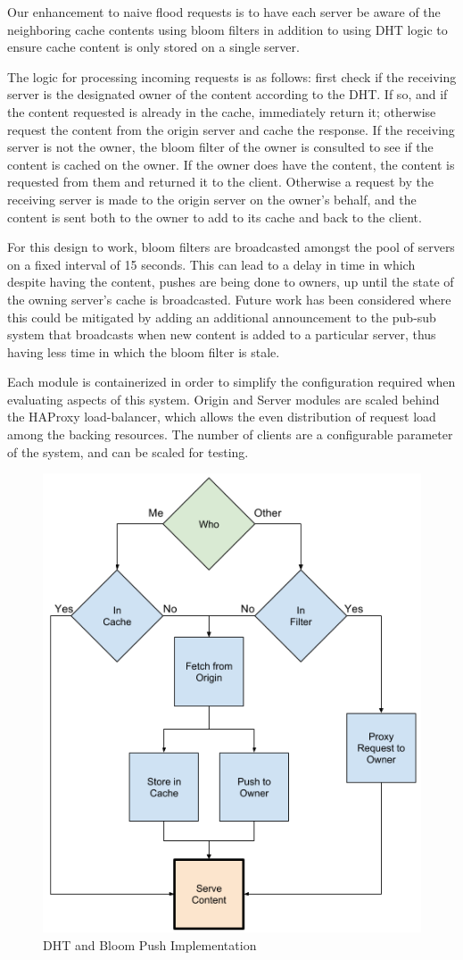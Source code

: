 \documentclass[conference]{IEEEtran}
\begin{document}
Our enhancement to naive flood requests is to have each server be aware of the neighboring cache contents using bloom filters in addition to using DHT logic to ensure cache content is only stored on a single server.  

The logic for processing incoming requests is as follows: first check if the receiving server is the designated owner of the content according to the DHT.  If so, and if the content requested is already in the cache, immediately return it; otherwise request the content from the origin server and cache the response.  If the receiving server is not the owner, the bloom filter of the owner is consulted to see if the content is cached on the owner.  If the owner does have the content, the content is requested  from them and returned it to the client. Otherwise a request by the receiving server is made to the origin server on the owner’s behalf, and the content is sent both to the owner to add to its cache and back to the client. 

For this design to work, bloom filters are broadcasted amongst the pool of servers on a fixed interval of 15 seconds.  This can lead to a delay in time in which despite having the content, pushes are being done to owners, up until the state of the owning server’s cache is broadcasted. Future work has been considered where this could be mitigated by adding an additional announcement to the pub-sub system that broadcasts when new content is added to a particular server, thus having less time in which the bloom filter is stale.

Each module is containerized in order to simplify the configuration required when evaluating aspects of this system.  Origin and Server modules are scaled behind the HAProxy load-balancer, which allows the even distribution of request load among the backing resources. The number of clients are a configurable parameter of the system, and can be scaled for testing. 

\begin{figure}[!h]
	\centering
	\includegraphics[width=0.7\columnwidth]{figures/cache_logic_after.png}
	\caption{DHT and Bloom Push Implementation}
\end{figure}
\end{document}
